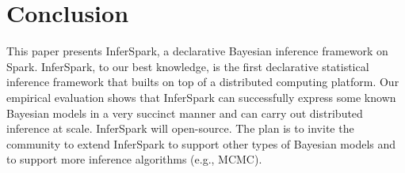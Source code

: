 
\section{Conclusion}
\label{sec:conclusion}

This paper presents InferSpark, 
a declarative Bayesian inference framework on Spark.
InferSpark, to our best knowledge, is the first declarative 
statistical inference framework
that builts on top of a distributed computing platform.
Our empirical evaluation shows that InferSpark can successfully express 
some known Bayesian models in a very succinct manner
and can carry out distributed inference at scale.
InferSpark will open-source.  
The plan is to invite the community to extend InferSpark to 
support other types of Bayesian models 
and to support more inference algorithms (e.g., MCMC).

